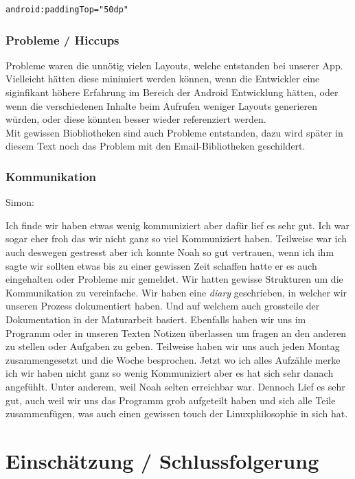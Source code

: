 \documentclass[a4paper,11pt]{article}
\begin{document}
\lstset{language=XML}
\begin{lstlisting}
android:paddingTop="50dp"
\end{lstlisting}

\subsubsection{Probleme / Hiccups}
Probleme waren die unnötig vielen Layouts, welche entstanden bei unserer App. Vielleicht hätten diese minimiert werden können, wenn die Entwickler eine siginfikant höhere Erfahrung im Bereich der Android Entwicklung hätten, oder wenn die verschiedenen Inhalte beim Aufrufen weniger Layouts generieren würden, oder diese könnten besser wieder referenziert werden.\\

Mit gewissen Biobliotheken sind auch Probleme entstanden, dazu wird später in diesem Text noch das Problem mit den Email-Bibliotheken geschildert.

\subsubsection{Kommunikation}
Simon:

Ich finde wir haben etwas wenig kommuniziert aber dafür lief es sehr gut. Ich war sogar eher froh das wir nicht ganz so viel 
Kommuniziert haben. Teilweise war ich auch deswegen gestresst aber ich konnte Noah so gut vertrauen, wenn ich ihm sagte wir sollten etwas bis zu einer gewissen Zeit schaffen
hatte er es auch eingehalten oder Probleme mir gemeldet. Wir hatten gewisse Strukturen um die Kommunikation zu vereinfache. Wir haben 
eine \textit{diary} geschrieben, in welcher wir unseren Prozess dokumentiert haben. Und auf welchem auch grossteile der Dokumentation in der Maturarbeit basiert. 
Ebenfalls haben wir uns im Programm oder in unseren Texten Notizen überlassen um fragen an den anderen zu stellen oder Aufgaben zu geben. Teilweise haben wir uns auch jeden Montag zusammengesetzt
und die Woche besprochen. Jetzt wo ich alles Aufzähle merke ich wir haben nicht ganz so wenig Kommuniziert aber es hat sich sehr danach angefühlt. Unter anderem, weil Noah selten erreichbar
war. Dennoch Lief es sehr gut, auch weil wir uns das Programm grob aufgeteilt haben und sich alle Teile zusammenfügen, was auch einen gewissen touch der Linuxphilosophie in sich hat. 

\section{Einschätzung / Schlussfolgerung}
\end{document}
